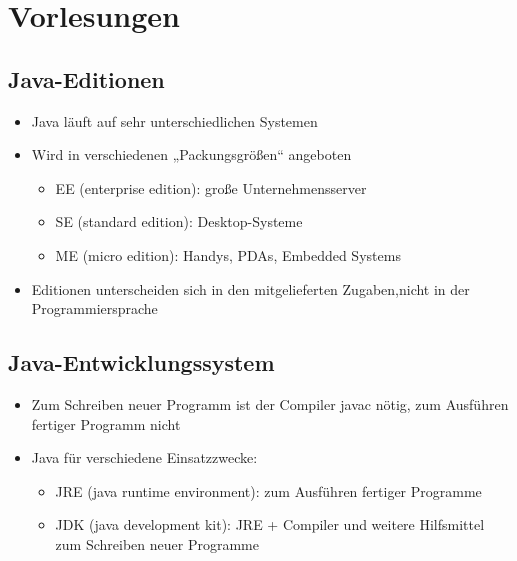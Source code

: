 \chapter{Vorlesungen}
%
%
%
\section{Java-Editionen}
	\begin{itemize}
	\item Java läuft auf sehr unterschiedlichen Systemen
	\item  Wird in verschiedenen „Packungsgrößen“ angeboten
	\begin{itemize}
		\item EE (enterprise edition): große Unternehmensserver
		\item SE (standard edition): Desktop-Systeme
		\item ME (micro edition): Handys, PDAs, Embedded Systems
	\end{itemize}
	\item Editionen unterscheiden sich in den mitgelieferten Zugaben,nicht in der Programmiersprache
	\end{itemize}
%
%
%
\section{Java-Entwicklungssystem}
\begin{itemize}
\item Zum Schreiben neuer Programm ist der Compiler javac nötig, zum Ausführen fertiger Programm nicht
\item  Java für verschiedene Einsatzzwecke:
	\begin {itemize}
		\item JRE (java runtime environment): zum Ausführen fertiger Programme
		\item JDK (java development kit): JRE + Compiler und weitere Hilfsmittel zum Schreiben neuer Programme
	\end{itemize}
\end{itemize}
